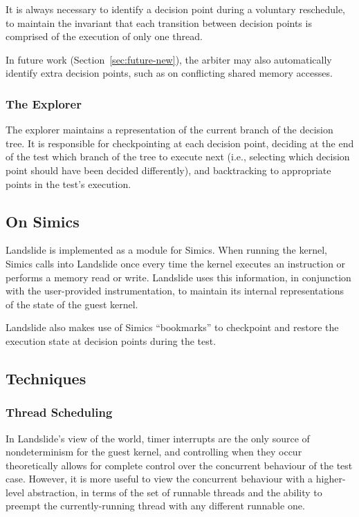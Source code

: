 It is always necessary to identify a decision point during a voluntary reschedule, to maintain the invariant that each transition between decision points is comprised of the execution of only one thread.

In future work (Section~\ref{sec:future-new}), the arbiter may also automatically identify extra decision points, such as on conflicting shared memory accesses.

\subsubsection{The Explorer}

The explorer maintains a representation of the current branch of the decision tree. It is responsible for checkpointing at each decision point, deciding at the end of the test which branch of the tree to execute next (i.e., selecting which decision point should have been decided differently), and backtracking to appropriate points in the test's execution.

\subsection{On Simics}

Landslide is implemented as a module for Simics\cite{simics}. When running the kernel, Simics calls into Landslide once every time the kernel executes an instruction or performs a memory read or write. Landslide uses this information, in conjunction with the user-provided instrumentation, to maintain its internal representations of the state of the guest kernel.

Landslide also makes use of Simics ``bookmarks'' to checkpoint and restore the execution state at decision points during the test.

\subsection{Techniques}

\subsubsection{Thread Scheduling}

In Landslide's view of the world, timer interrupts are the only source of nondeterminism for the guest kernel, and controlling when they occur theoretically allows for complete control over the concurrent behaviour of the test case. However, it is more useful to view the concurrent behaviour with a higher-level abstraction, in terms of the set of runnable threads and the ability to preempt the currently-running thread with any different runnable one.

